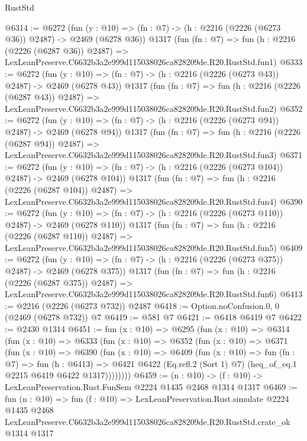 \begin{lexlean}{RustStd}
\begin{coremodule}
@6314 := @6272
    (fun (y : @10) => (fn : @7) -> (h : @2216 (@2226 (@6273 @36)) @2487) -> @2469 (@6278 @36))
    @1317
    (fun (fn : @7) =>
    fun (h : @2216 (@2226 (@6287 @36)) @2487) =>
    LexLeanPreserve.C6632b3a2e999d115038026ca828209de.R20.RustStd.fun1)
@6333 := @6272
    (fun (y : @10) => (fn : @7) -> (h : @2216 (@2226 (@6273 @43)) @2487) -> @2469 (@6278 @43))
    @1317
    (fun (fn : @7) =>
    fun (h : @2216 (@2226 (@6287 @43)) @2487) =>
    LexLeanPreserve.C6632b3a2e999d115038026ca828209de.R20.RustStd.fun2)
@6352 := @6272
    (fun (y : @10) => (fn : @7) -> (h : @2216 (@2226 (@6273 @94)) @2487) -> @2469 (@6278 @94))
    @1317
    (fun (fn : @7) =>
    fun (h : @2216 (@2226 (@6287 @94)) @2487) =>
    LexLeanPreserve.C6632b3a2e999d115038026ca828209de.R20.RustStd.fun3)
@6371 := @6272
    (fun (y : @10) => (fn : @7) -> (h : @2216 (@2226 (@6273 @104)) @2487) -> @2469 (@6278 @104))
    @1317
    (fun (fn : @7) =>
    fun (h : @2216 (@2226 (@6287 @104)) @2487) =>
    LexLeanPreserve.C6632b3a2e999d115038026ca828209de.R20.RustStd.fun4)
@6390 := @6272
    (fun (y : @10) => (fn : @7) -> (h : @2216 (@2226 (@6273 @110)) @2487) -> @2469 (@6278 @110))
    @1317
    (fun (fn : @7) =>
    fun (h : @2216 (@2226 (@6287 @110)) @2487) =>
    LexLeanPreserve.C6632b3a2e999d115038026ca828209de.R20.RustStd.fun5)
@6409 := @6272
    (fun (y : @10) => (fn : @7) -> (h : @2216 (@2226 (@6273 @375)) @2487) -> @2469 (@6278 @375))
    @1317
    (fun (fn : @7) =>
    fun (h : @2216 (@2226 (@6287 @375)) @2487) =>
    LexLeanPreserve.C6632b3a2e999d115038026ca828209de.R20.RustStd.fun6)
@6413 := @2216 (@2226 (@6273 @732)) @2487
@6418 := Option.noConfusion.{0, 0} (@2469 (@6278 @732)) @7
@6419 := @581 @7
@6421 := @6418 @6419 @7
@6422 := @2430 @1314
@6451 := fun (x : @10) =>
  @6295
    (fun (x : @10) =>
    @6314
      (fun (x : @10) =>
      @6333
        (fun (x : @10) =>
        @6352
          (fun (x : @10) =>
          @6371
            (fun (x : @10) =>
            @6390
              (fun (x : @10) =>
              @6409
                (fun (x : @10) =>
                fun (fn : @7) =>
                fun (h : @6413) =>
                @6421 @6422 (Eq.refl.{2} (Sort 1) @7) (heq_of_eq.{1} @2215 @6419 @6422 @1317))))))))
@6459 := (n : @10) -> (f : @10) -> LexLeanPreservation.Rust.FunSem @2224 @1435 @2468 @1314 @1317
@6469 := fun (n : @10) =>
  fun (f : @10) =>
  LexLeanPreservation.Rust.simulate
    @2224
    @1435
    @2468
    LexLeanPreserve.C6632b3a2e999d115038026ca828209de.R20.RustStd.crate_ok
    @1314
    @1317
\end{coremodule}
\end{lexlean}
